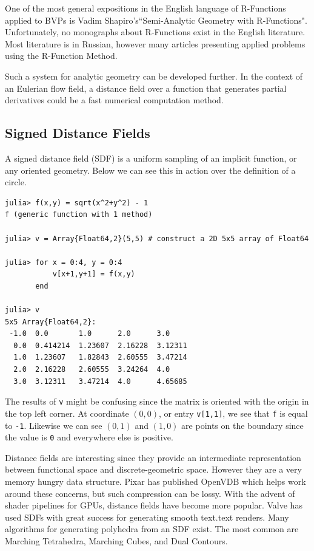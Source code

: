 One of the most general expositions in the English language of R-Functions
applied to BVPs is
Vadim Shapiro's``Semi-Analytic Geometry with R-Functions". \cite{shapiro2007semi}
Unfortunately, no monographs about R-Functions exist in the English literature.
Most literature is in Russian, however many articles presenting applied
problems using the R-Function Method. \cite{voron2010}

Such a system for analytic geometry can be developed further. In the context
of an Eulerian flow field, a distance field over a function that
generates partial derivatives could be a fast numerical computation method.


\subsection{Signed Distance Fields}


A signed distance field (SDF) is a uniform sampling of an implicit function,
or any oriented geometry. 
Below
we can see this in action over the definition of a circle.

\begin{lstlisting}
julia> f(x,y) = sqrt(x^2+y^2) - 1
f (generic function with 1 method)

julia> v = Array{Float64,2}(5,5) # construct a 2D 5x5 array of Float64

julia> for x = 0:4, y = 0:4
           v[x+1,y+1] = f(x,y)
       end

julia> v
5x5 Array{Float64,2}:
 -1.0  0.0       1.0      2.0      3.0    
  0.0  0.414214  1.23607  2.16228  3.12311
  1.0  1.23607   1.82843  2.60555  3.47214
  2.0  2.16228   2.60555  3.24264  4.0    
  3.0  3.12311   3.47214  4.0      4.65685
\end{lstlisting}

The results of \texttt{v} might be confusing since the matrix is oriented with
the origin in the top left corner. At coordinate $(0,0)$, or entry \texttt{v[1,1]},
we see that \texttt{f} is
equal to \texttt{-1}. Likewise we can see $(0,1)$ and $(1,0)$ are points on
the boundary since the value is \texttt{0} and everywhere else is positive.

Distance fields are interesting since they provide an intermediate representation
between functional space and discrete-geometric space. However they are
a very memory hungry data structure. Pixar has published OpenVDB which helps
work around these concerns, but such compression can be lossy.\cite{OpenVDB}
With the advent of shader pipelines for GPUs, distance fields have become
more popular. Valve has used SDFs with great success for generating smooth
text.text renders. \cite{Green_2007}
Many algorithms for generating polyhedra from an SDF
exist. The most common are Marching Tetrahedra, Marching Cubes,
and Dual Contours.\cite{Muller_Wehle_1997}\cite{Newman_Yi_2006}\cite{Cook_Hourvitz}

